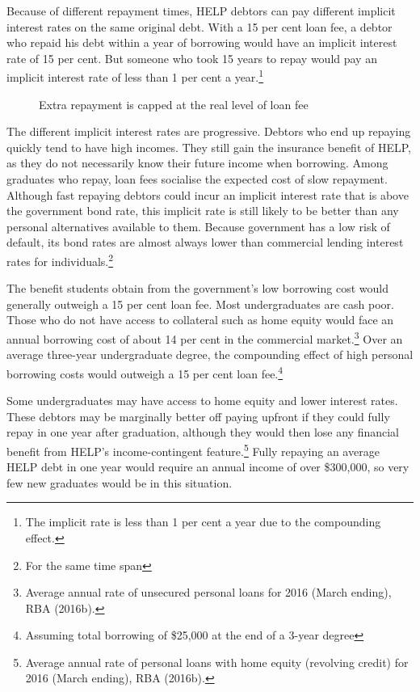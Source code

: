 \documentclass[embargoed]{grattan}
\begin{document}
Because of different repayment times, HELP debtors can pay different implicit interest rates on the same original debt. With a 15 per cent loan fee, a debtor who repaid his debt within a year of borrowing would have an implicit interest rate of 15 per cent. But someone who took 15 years to repay would pay an implicit interest rate of less than 1 per cent a year.\footnote{The implicit rate is less than 1 per cent a year due to the compounding effect.}

\begin{figure}
\caption{Extra repayment is capped at the real level of loan fee}\label{fig:fig22-extra-repayment-capped-at-real-level-of-loan-fee}


\end{figure}

The different implicit interest rates are progressive. Debtors who end up repaying quickly tend to have high incomes. They still gain the insurance benefit of HELP, as they do not necessarily know their future income when borrowing. Among graduates who repay, loan fees socialise the expected cost of slow repayment. Although fast repaying debtors could incur an implicit interest rate that is above the government bond rate, this implicit rate is still likely to be better than any personal alternatives available to them. Because government has a low risk of default, its bond rates are almost always lower than commercial lending interest rates for individuals.\footnote{For the same time span}

The benefit students obtain from the government's low borrowing cost would generally outweigh a 15 per cent loan fee. Most undergraduates are cash poor. Those who do not have access to collateral such as home equity would face an annual borrowing cost of about 14 per cent in the commercial market.\footnote{Average annual rate of unsecured personal loans for 2016 (March ending), RBA (2016b).} Over an average three-year undergraduate degree, the compounding effect of high personal borrowing costs would outweigh a 15 per cent loan fee.\footnote{Assuming total borrowing of \$25,000 at the end of a 3-year degree}

Some undergraduates may have access to home equity and lower interest rates. These debtors may be marginally better off paying upfront if they could fully repay in one year after graduation, although they would then lose any financial benefit from HELP's income-contingent feature.\footnote{Average annual rate of personal loans with home equity (revolving credit) for 2016 (March ending), RBA (2016b).} Fully repaying an average HELP debt in one year would require an annual income of over \$300,000, so very few new graduates would be in this situation.
\end{document}
